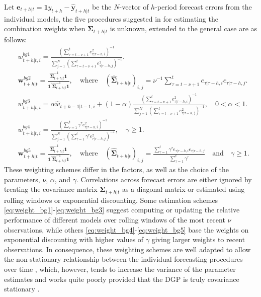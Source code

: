 \documentclass[11pt]{article}
\begin{document}
Let $\mathbf{e}_{t+h|t}=\mathbf{1} y_{t+h}-\hat{\mathbf{y}}_{t+h|t}$ be the $N$-vector of $h$-period forecast errors from the individual models, the five procedures suggested in \cite{Bates1969-yj} for estimating the combination weights when $\boldsymbol{\Sigma}_{t+h|t}$ is unknown, extended to the general case are as follows:
\begin{align}
&w_{t+h|t, i}^{bg1}=\frac{\left( \sum_{\tau=t-\nu+1}^{t} e_{\tau|\tau-h, i}^{2} \right)^{-1}}{\sum_{j=1}^{N}\left(\sum_{\tau=t-\nu+1}^{t} e_{\tau|\tau-h, j}^{2}\right)^{-1}}. \label{eq:weight_bg1}\\
&\boldsymbol{w}_{t+h|t}^{bg2}=\frac{\hat{\boldsymbol{\Sigma}}_{t+h|t}^{-1}\mathbf{1}}{\mathbf{1}^{\prime} \hat{\boldsymbol{\Sigma}}_{t+h|t}^{-1} \mathbf{1}}, \quad \text{where} \quad (\hat{\boldsymbol{\Sigma}}_{t+h|t})_{i, j}=\nu^{-1} \sum_{\tau=t-\nu+1}^{t} e_{\tau|\tau-h, i} e_{\tau|\tau-h, j}. \label{eq:weight_bg2}\\
&w_{t+h|t, i}^{bg3}=\alpha \hat{w}_{t+h-1|t-1, i} + (1-\alpha) \frac{\left( \sum_{\tau=t-\nu+1}^{t} e_{\tau|\tau-h, i}^{2} \right)^{-1}}{\sum_{j=1}^{N}\left(\sum_{\tau=t-\nu+1}^{t} e_{\tau|\tau-h, j}^{2}\right)^{-1}}, \quad 0<\alpha<1. \label{eq:weight_bg3}\\
&w_{t+h|t, i}^{bg4}=\frac{\left( \sum_{\tau=1}^{t} \gamma^{\tau} e_{\tau|\tau-h, i}^{2} \right)^{-1}}{\sum_{j=1}^{N}\left(\sum_{\tau=1}^{t} \gamma^{\tau} e_{\tau|\tau-h, j}^{2}\right)^{-1}}, \quad \gamma \geq 1. \label{eq:weight_bg4}\\
&\boldsymbol{w}_{t+h|t}^{bg5}=\frac{\hat{\boldsymbol{\Sigma}}_{t+h|t}^{-1}\mathbf{1}}{\mathbf{1}^{\prime} \hat{\boldsymbol{\Sigma}}_{t+h|t}^{-1} \mathbf{1}}, \quad \text{where} \quad (\hat{\boldsymbol{\Sigma}}_{t+h|t})_{i, j}=\frac{\sum_{\tau=1}^{t} \gamma^{\tau} e_{\tau|\tau-h, i} e_{\tau|\tau-h, j}}{\sum_{\tau=1}^{t} \gamma^{\tau}} \quad \text{and} \quad \gamma \geq 1. \label{eq:weight_bg5}
\end{align}
These weighting schemes differ in the factors, as well as the choice of the parameters, $\nu$, $\alpha$, and $\gamma$. Correlations across forecast errors are either ignored by treating the covariance matrix $\boldsymbol{\Sigma}_{t+h|t}$ as a diagonal matrix or estimated using rolling windows or exponential discounting. Some estimation schemes \eqref{eq:weight_bg1}-\eqref{eq:weight_bg3} suggest computing or updating the relative performance of different models over rolling windows of the most recent $\nu$ observations, while others \eqref{eq:weight_bg4}-\eqref{eq:weight_bg5} base the weights on exponential discounting with higher values of $\gamma$ giving larger weights to recent observations. In consequence, these weighting schemes are well adapted to allow the non-stationary relationship between the individual forecasting procedures over time \citep{Newbold1974-lp}, which, however, tends to increase the variance of the parameter estimates and works quite poorly provided that the DGP is truly covariance stationary \citep{Timmermann2006-en}.
\end{document}
